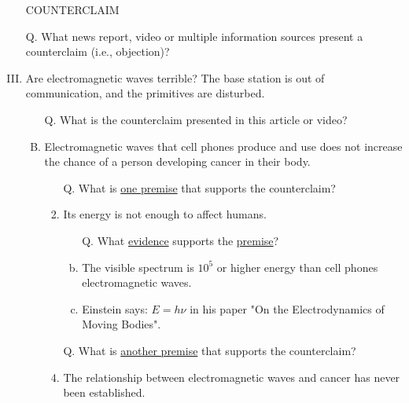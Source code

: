 \documentclass[a4paper, 12pt]{article}
\begin{document}
\begin{CJK*}{UTF8}{bsmi}
\begin{enumerate}[I.]
\begin{enumerate}[A.]
\begin{enumerate}[1.]
                              \end{enumerate}
                  \end{enumerate}
            \item [] {\color{red}COUNTERCLAIM}
            \item [Q.] What news report, video or multiple information sources present a {\color{red} counterclaim} (i.e., objection)?
            \item Are electromagnetic waves terrible? The base station is out of communication, and the primitives are disturbed. \parencite{20210822}
                  \begin{enumerate}[A.]
                        \item [Q.] What is the {\color{red} counterclaim} presented in this article or video?
                        \item Electromagnetic waves that cell phones produce and use does not increase the chance of a person developing cancer in their body.
                              \begin{enumerate}[1.]
                                    \item[Q.] What is \underline{one premise} that supports the {\color{red}counterclaim}?
                                    \item Its energy is not enough to affect humans.
                                          \begin{enumerate}[a.]
                                                \item [Q.] What \underline{evidence} supports the \underline{premise}?
                                                \item The visible spectrum is $10^5$ or higher energy than cell phones electromagnetic waves.
                                                \item Einstein says: $E=h\nu$ in his paper "On the Electrodynamics of Moving Bodies". \parencite{Einstein}
                                          \end{enumerate}
                                    \item [Q.] What is \underline{another premise} that supports the {\color{red}counterclaim}?
                                    \item The relationship between electromagnetic waves and cancer has never been established.
                                          \begin{enumerate}[a.]

\end{enumerate}
\end{enumerate}
\end{enumerate}
\end{enumerate}
\end{CJK*}
\end{document}
